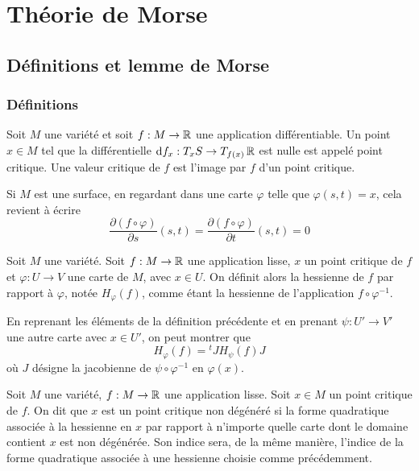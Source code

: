 \section{Théorie de Morse}

\subsection{Définitions et lemme de Morse}

\subsubsection{Définitions}
\begin{defi}
    Soit $M$ une variété et soit $f:M\to\operatorname{\mathbb R}$ une application différentiable.
    Un point $x\in M$ tel que la différentielle $\operatorname{d}\hskip-1.5pt f_x:T_xS\to T_{f(x)}\operatorname{\mathbb R}$ 
    est nulle est appelé point critique. Une valeur critique de $f$ est 
    l'image par $f$ d'un point critique.
\end{defi}

Si $M$ est une surface, en regardant dans une carte $\varphi$ telle que $\varphi(s,t)=x$, 
cela revient à écrire 
\[
    \frac{\partial(f\circ\varphi)}{\partial s}(s,t)=
    \frac{\partial(f\circ\varphi)}{\partial t}(s,t)=0
\]

\begin{defi}
    Soit $M$ une variété.
    Soit $f:M\to \operatorname{\mathbb R}$ une application lisse, $x$ un point critique de $f$ et $\varphi:U\to V$ 
    une carte de $M$, avec $x\in U$. 
    On définit alors la hessienne de $f$ par rapport à $\varphi$, notée $H_\varphi(f)$, comme 
    étant la hessienne de l'application $f\circ\varphi^{-1}$. 
\end{defi}

\begin{remark}
    En reprenant les éléments de la définition précédente et en prenant $\psi:U'\to V'$ une 
    autre carte avec $x\in U'$, on peut montrer que 
    \[
        H_\varphi(f)={}^tJH_\psi(f)J
    \]
    où $J$ désigne la jacobienne de $\psi\circ\varphi^{-1}$ en $\varphi(x)$.
\end{remark}

\begin{defi}
    Soit $M$ une variété, $f:M\to \operatorname{\mathbb R}$ une application lisse.
    Soit $x\in M$ un point critique de $f$. 
    On dit que $x$ est un point critique non dégénéré si la forme quadratique associée 
    à la hessienne en $x$ par rapport à n'importe quelle carte dont le domaine contient 
    $x$ est non dégénérée. 
    Son indice sera, de la même manière, l'indice de la forme quadratique associée à une
    hessienne choisie comme précédemment.
\end{defi}

